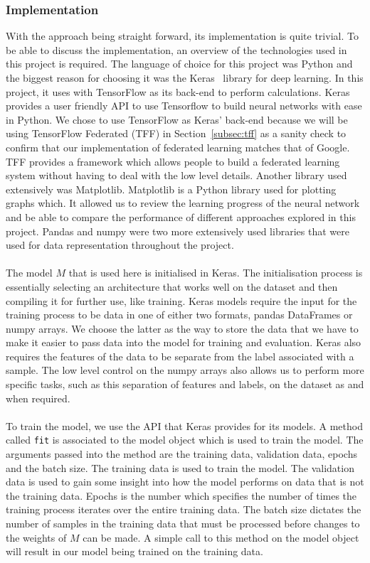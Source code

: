 \documentclass[12pt]{article}
\begin{document}
\subsubsection{Implementation}
With the approach being straight forward, its implementation is quite trivial. To be able to discuss the implementation, an overview of the technologies used in this project is required. The language of choice for this project was Python and the biggest reason for choosing it was the Keras~\cite{chollet2015keras} library for deep learning. In this project, it uses with TensorFlow as its back-end to perform calculations. Keras provides a user friendly API to use Tensorflow to build neural networks with ease in Python. We chose to use TensorFlow as Keras' back-end because we will be using TensorFlow Federated (TFF) in Section~\ref{subsec:tff} as a sanity check to confirm that our implementation of federated learning matches that of Google. TFF provides a framework which allows people to build a federated learning system without having to deal with the low level details. Another library used extensively was Matplotlib. Matplotlib is a Python library used for plotting graphs which. It allowed us to review the learning progress of the neural network and be able to compare the performance of different approaches explored in this project. Pandas and numpy were two more extensively used libraries that were used for data representation throughout the project.
\\\\
The model $M$ that is used here is initialised in Keras. The initialisation process is essentially selecting an architecture that works well on the dataset and then compiling it for further use, like training. Keras models require the input for the training process to be data in one of either two formats, pandas DataFrames or numpy arrays. We choose the latter as the way to store the data that we have to make it easier to pass data into the model for training and evaluation. Keras also requires the features of the data to be separate from the label associated with a sample. The low level control on the numpy arrays also allows us to perform more specific tasks, such as this separation of features and labels, on the dataset as and when required.
\\\\
To train the model, we use the API that Keras provides for its models. A method called \texttt{fit} is associated to the model object which is used to train the model. The arguments passed into the method are the training data, validation data, epochs and the batch size. The training data is used to train the model. The validation data is used to gain some insight into how the model performs on data that is not the training data. Epochs is the number which specifies the number of times the training process iterates over the entire training data. The batch size dictates the number of samples in the training data that must be processed before changes to the weights of $M$ can be made. A simple call to this method on the model object will result in our model being trained on the training data.
\end{document}
